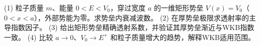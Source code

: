 (1) 粒子质量 \(m\)、能量 \(0<E<V_0\)，穿过宽度 \(a\) 的一维矩形势垒 \(V(x)=V_0\)（\(0<x<a\)），外部势能为零。求势垒内衰减波数。
(2) 在厚势垒极限求透射率的主导指数因子。
(3) 给出矩形势垒精确透射系数，并验证其厚势垒渐近与WKB指数一致。
(4) 比较 \(a\to0\)、\(V_0\to E^+\) 和粒子质量增大的趋势，解释WKB适用范围。
